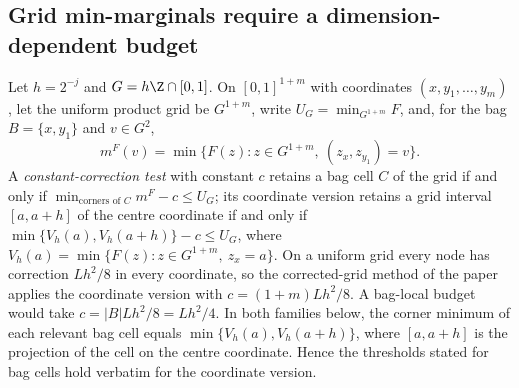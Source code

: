 \subsection{Grid min-marginals require a dimension-dependent budget}\label{sec:cr-star}

Let $h=2^{-j}$ and $G=h\Z\cap[0,1]$. On $[0,1]^{1+m}$ with coordinates
$(x,y_1,\ldots,y_m)$, let the uniform product grid be $G^{1+m}$, write
$U_G=\min_{G^{1+m}}F$, and, for the bag $B=\{x,y_1\}$ and $v\in G^2$,
\[
m^F(v)=\min\{F(z):z\in G^{1+m},\ (z_x,z_{y_1})=v\}.
\]
A \emph{constant-correction test} with constant $c$ retains a bag cell
$C$ of the grid if and only if $\min_{\text{corners of }C}m^F-c\le U_G$;
its coordinate version retains a grid interval $[a,a+h]$ of the centre
coordinate if and only if $\min\{V_h(a),V_h(a+h)\}-c\le U_G$, where
$V_h(a)=\min\{F(z):z\in G^{1+m},\ z_x=a\}$. On a uniform grid every node has
correction $Lh^2/8$ in every coordinate, so the corrected-grid method of
the paper applies the coordinate version with $c=(1+m)Lh^2/8$. A bag-local
budget would take $c=|B|Lh^2/8=Lh^2/4$. In both families below, the
corner minimum of each relevant bag cell equals
$\min\{V_h(a),V_h(a+h)\}$, where $[a,a+h]$ is the projection of the cell
on the centre coordinate. Hence the thresholds stated for bag cells hold
verbatim for the coordinate version.

